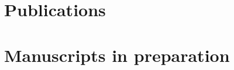 \documentclass[11pt]{article}
\begin{document}




  \section{Publications}

  { \setlength{\parskip}{2.5ex}


    
  }

  \section{Manuscripts in preparation}
\end{document}
